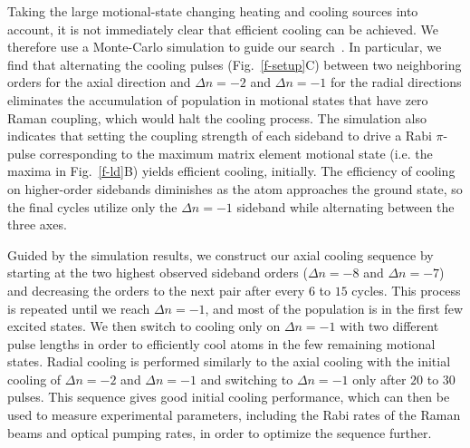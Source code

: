 \documentclass[aps,prl,twocolumn,groupedaddress]{revtex4-1}
\begin{document}
Taking the large motional-state changing heating and cooling sources
 into account,
it is not immediately clear that efficient cooling can be achieved.
We therefore use a Monte-Carlo simulation to guide our search~\cite{Dalibard1992}.
In particular, we find that alternating the cooling pulses (Fig.~\ref{f-setup}C) between two
neighboring orders for the axial direction and $\Delta n=-2$ and $\Delta n=-1$ for the radial directions
eliminates the accumulation of population in motional states that have zero Raman coupling, which would halt the cooling process.
The simulation also indicates that setting the coupling strength of each  sideband
to drive a Rabi $\pi$-pulse corresponding to the maximum matrix element motional state
(i.e. the maxima in Fig.~\ref{f-ld}B)  yields efficient cooling, initially.
The efficiency of cooling on higher-order sidebands diminishes
as the atom approaches the ground state, so the final  cycles utilize only the $\Delta n=-1$ sideband while alternating between the three  axes.

Guided by the simulation results,
we construct our axial cooling sequence by starting at the two highest
observed  sideband orders ($\Delta n=-8$ and $\Delta n=-7$)
and decreasing the orders to the next pair after every $6$ to $15$ cycles.
This process is repeated until we reach $\Delta n=-1$, and most of the
population is in the first few excited states. We then switch to cooling only on $\Delta n=-1$ with two different pulse lengths in order to efficiently cool atoms in the
few remaining motional states.
Radial cooling is performed similarly to the axial cooling with the initial cooling of $\Delta n=-2$ and $\Delta n=-1$ and switching to $\Delta n=-1$ only after $20$ to $30$ pulses.
This sequence gives good initial cooling performance, which can then be used to measure experimental
parameters, including the Rabi rates of the Raman beams and optical pumping rates,
in order to optimize the sequence further.
\end{document}
